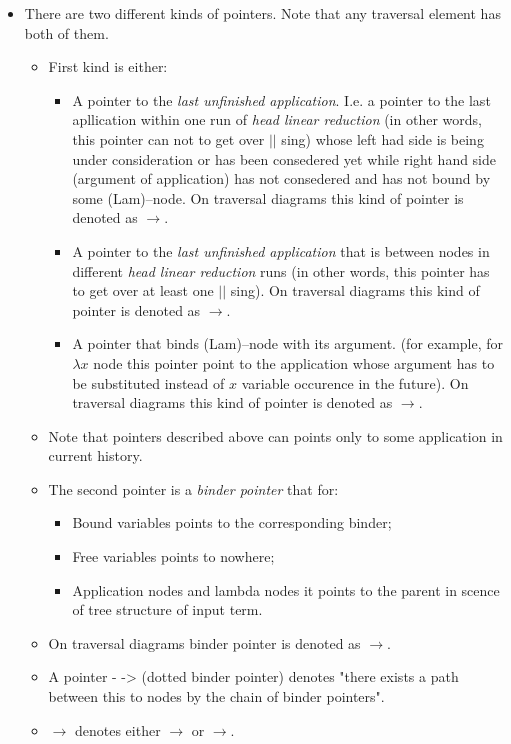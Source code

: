 \documentclass[a4paper, 10pt]{article}
\begin{document}
\begin{itemize}
\item There are two different kinds of pointers. Note that any traversal element has both of them.
  \begin{itemize}
  \item First kind is either:
    \begin{itemize}
    \item A pointer to the \textit{last unfinished application}. I.e. a pointer to the last apllication within one run of \textit{head linear reduction} (in other
      words, this pointer can not to get over {\color{blue}$||$} sing) whose left had side is being under consideration or
      has been consedered yet while right hand side (argument of application) has not consedered and has not bound by some (Lam)--node.
      On traversal diagrams this kind of pointer is denoted as {\color{brown}$\rightarrow$}.
    \item A pointer to the \textit{last unfinished application} that is between nodes in different \textit{head linear reduction} runs (in other
      words, this pointer has to get over at least one {\color{blue}$||$} sing).
      On traversal diagrams this kind of pointer is denoted as {\color{red}$\rightarrow$}.
    \item A pointer that binds (Lam)--node with its argument. (for example, for $\lambda x$ node this pointer point to the application whose argument
      has to be substituted instead of $x$ variable occurence in the future).
      On traversal diagrams this kind of pointer is denoted as {\color{violet}$\rightarrow$}.
    \end{itemize}
  \item Note that pointers described above can points only to some application in current history.
  \item The second pointer is a \textit{binder pointer} that for:
    \begin{itemize}
    \item Bound variables points to the corresponding binder;
    \item Free variables points to nowhere;
    \item Application nodes and lambda nodes it points to the parent in scence of tree structure of input term.
    \end{itemize}
  \item On traversal diagrams binder pointer is denoted as {\color{green}$\rightarrow$}.
  \item A pointer {\color{green} - ->} (dotted binder pointer) denotes "there exists a path between this to nodes by the chain of binder pointers".
  \item {\color{blue}$\rightarrow$} denotes either {\color{brown}$\rightarrow$} or {\color{violet}$\rightarrow$}.
  \end{itemize}
\end{itemize}
\end{document}
